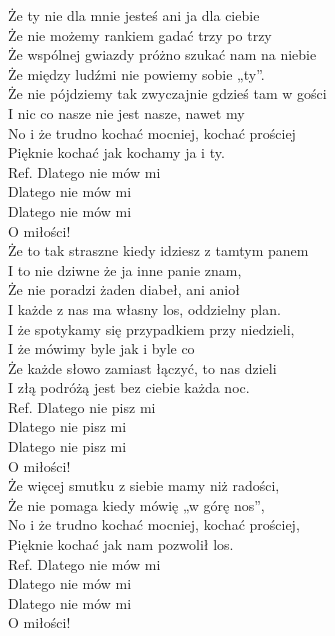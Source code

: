 
\begin{flushleft}
Że ty nie dla mnie jesteś ani ja dla ciebie  \\
Że nie możemy rankiem gadać trzy po trzy  \\
Że wspólnej gwiazdy próżno szukać nam na niebie  \\
Że między ludźmi nie powiemy sobie „ty”. \\
\vskip 3mm
Że nie pójdziemy tak zwyczajnie gdzieś tam w gości  \\
I nic co nasze nie jest nasze, nawet my  \\
No i że trudno kochać mocniej, kochać prościej  \\
Pięknie kochać jak kochamy ja i ty. \\
\vskip 3mm
Ref. Dlatego nie mów mi  \\
\hspace{0.9cm}Dlatego nie mów mi  \\
\hspace{0.9cm}Dlatego nie mów mi  \\
\hspace{0.9cm}O miłości! \\
\vskip 3mm
Że to tak straszne kiedy idziesz z tamtym panem  \\
I to nie dziwne że ja inne panie znam, \\
Że nie poradzi żaden diabeł, ani anioł  \\
I każde z nas ma własny los, oddzielny plan.  \\
\vskip 3mm
I że spotykamy się przypadkiem przy niedzieli,  \\
I że mówimy byle jak i byle co  \\
Że każde słowo zamiast łączyć, to nas dzieli \\
I złą podróżą jest bez ciebie każda noc. \\
\vskip 3mm
Ref. Dlatego nie pisz mi  \\
\hspace{0.9cm}Dlatego nie pisz mi  \\
\hspace{0.9cm}Dlatego nie pisz mi  \\
\hspace{0.9cm}O miłości! \\
\vskip 3mm
Że więcej smutku z siebie mamy niż radości,  \\
Że nie pomaga kiedy mówię „w górę nos”,  \\
No i że trudno kochać mocniej, kochać prościej, \\
Pięknie kochać jak nam pozwolił los. \\
\vskip 3mm
Ref. Dlatego nie mów mi  \\
\hspace{0.9cm}Dlatego nie mów mi  \\
\hspace{0.9cm}Dlatego nie mów mi  \\
\hspace{0.9cm}O miłości! \\
\vskip 3mm
\end{flushleft}
\clearpage
